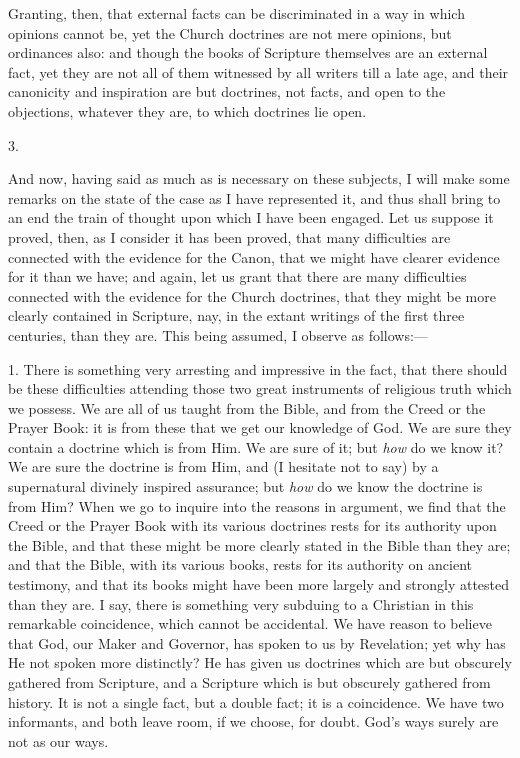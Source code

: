 Granting, then, that external facts can be discriminated in a way
in which opinions cannot be, yet the Church doctrines are not mere
opinions, but ordinances also: and though the books of Scripture
themselves are an external fact, yet they are not all of them
witnessed by all writers till a late age, and their canonicity and
inspiration are but doctrines, not facts, and open to the objections,
whatever they are, to which doctrines lie open.

3.

And now, having said as much as is necessary on these subjects, I
will make some remarks on the state of the case as I have represented
it, and thus shall bring to an end the train of thought upon which I
have been engaged. Let us suppose it proved, then, as I consider it
has been proved, that many difficulties are connected with the
evidence for the Canon, that we might have clearer evidence for it
than we have; and again, let us grant that there are many difficulties
connected with the evidence for the Church doctrines, that they might
be more clearly contained in Scripture, nay, in the extant writings of
the first three centuries, than they are. This being assumed, I
observe as follows:—

1. There is something very arresting and impressive in the fact,
that there should be these difficulties attending those two great
instruments of religious truth which we possess. We are all of us
taught from the Bible, and from the Creed or the Prayer Book: it is
from these that we get our knowledge of God. We are sure they contain
a doctrine which is from Him. We are sure of it; but \emph{how} do we
know it? We are sure the doctrine is from Him, and (I hesitate
not to say) by a supernatural divinely inspired assurance; but \emph{how}
do we know the doctrine is from Him? When we go to inquire into the
reasons in argument, we find that the Creed or the Prayer Book with
its various doctrines rests for its authority upon the Bible, and that
these might be more clearly stated in the Bible than they are; and
that the Bible, with its various books, rests for its authority on
ancient testimony, and that its books might have been more largely and
strongly attested than they are. I say, there is something very
subduing to a Christian in this remarkable coincidence, which cannot
be accidental. We have reason to believe that God, our Maker and
Governor, has spoken to us by Revelation; yet why has He not spoken
more distinctly? He has given us doctrines which are but obscurely
gathered from Scripture, and a Scripture which is but obscurely
gathered from history. It is not a single fact, but a double fact; it
is a coincidence. We have two informants, and both leave room, if we
choose, for doubt. God's ways surely are not as our ways.

